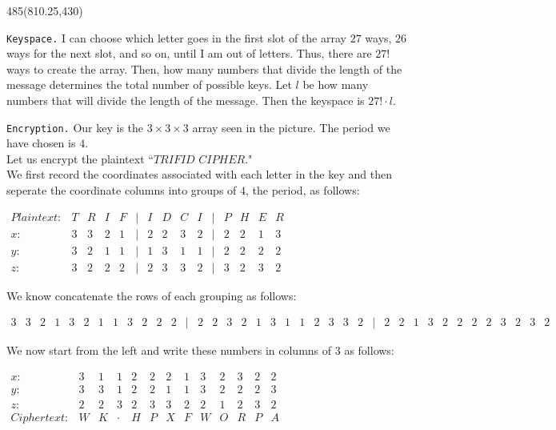 \documentclass{beamer}%
\begin{document}
\begin{textblock}{485}(810.25,430)
	\begin{block}{\texttt{Keyspace.}}
		I can choose which letter goes in the first slot of the array $27$ ways, $26$ ways for the next slot, and so on, until I am out of letters. Thus, there are $27!$ ways to create the array. Then, how many numbers that divide the length of the message determines the total number of possible keys. Let $l$ be how many numbers that will divide the length of the message. Then the keyspace is $27!\cdot l$.
	\end{block}
	\begin{block}{\texttt{Encryption.}}
		Our key is the $3\times 3\times 3$ array seen in the picture. The period we have chosen is $4$.\\
		Let us encrypt the plaintext ``$TRIFID$ $CIPHER$."\\
		We first record the coordinates associated with each letter in the key and then seperate the coordinate columns into groups of $4$, the period, as follows:
		\begin{center}
			$\begin{array}{lcccccccccccccc}
			Plaintext: & T & R & I & F &\mid& I & D & C & I &\mid& P & H & E & R \\ 
				x: & 3 & 3 & 2 & 1 & \mid & 2 & 2 & 3 & 2 & \mid & 2 & 2 & 1 & 3 \\ 
				y: & 3 & 2 & 1 & 1 & \mid & 1 & 3 & 1 & 1 & \mid & 2 & 2 & 2 & 2 \\ 
				z: & 3 & 2 & 2 & 2 & \mid & 2 & 3 & 3 & 2 & \mid & 3 & 2 & 3 & 2
			\end{array} $
		\end{center}
		We know concatenate the rows of each grouping as follows:
		\begin{center}
			$\begin{array}{cccccccccccccccccccccccccccccccccccccc}
			 3 & 3 & 2 & 1 & 3 & 2 & 1 & 1 & 3 & 2 & 2 & 2 & \mid & 2 & 2 & 3 & 2 & 1 & 3 & 1 & 1 & 2 & 3 & 3 & 2 & \mid & 2 & 2 & 1 & 3 & 2 & 2 & 2 & 2 & 3 & 2 & 3 & 2
			\end{array} $
		\end{center}
		We now start from the left and write these numbers in columns of $3$ as follows:
		\begin{center}
			$\begin{array}{lcccccccccccc}
			x: & 3 & 1 & 1 & 2 & 2 & 2 & 1 & 3 & 2 & 3 & 2 & 2 \\ 
			y: & 3 & 3 & 1 & 2 & 2 & 1 & 1 & 3 & 2 & 2 & 2 & 3 \\ 
			z: & 2 & 2 & 3 & 2 & 3 & 3 & 2 & 2 & 1 & 2 & 3 & 2 \\ 
			Ciphertext: & W & K & \cdot & H & P & X & F & W & O & R & P & A
			\end{array} $
		\end{center}
	\end{block}
	

\end{textblock}
\end{document}
